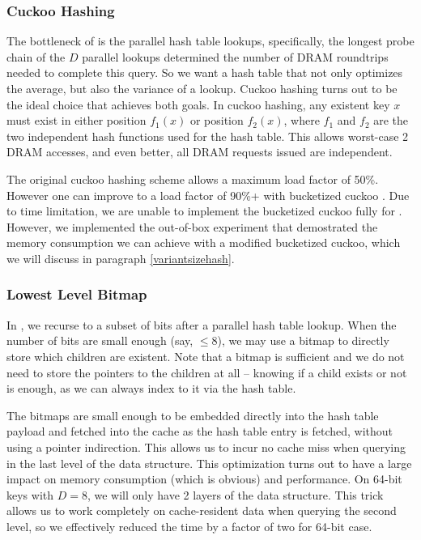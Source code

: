 \documentclass[11pt, usletter]{article}
\begin{document}
\subsubsection*{Cuckoo Hashing}

The bottleneck of \MlpIndex is the parallel hash table lookups, 
specifically, the longest probe chain of the $D$ parallel lookups determined the number 
of DRAM roundtrips needed to complete this query. 
So we want a hash table that not only optimizes the average, but also the variance of a lookup. 
Cuckoo hashing \cite{cuckoohash} turns out to be the ideal choice that achieves both goals. 
In cuckoo hashing, any existent key $x$ must exist in either position $f_1(x)$ 
or position $f_2(x)$, where $f_1$ and $f_2$ are the two independent hash functions used for the hash table.
This allows worst-case 2 DRAM accesses, and even better, all DRAM requests issued are independent. 

The original cuckoo hashing scheme allows a maximum load factor of 50\%. 
However one can improve to a load factor of 90\%+ with bucketized cuckoo \cite{bucketcuckoo}. 
Due to time limitation, we are unable to implement the bucketized cuckoo fully for \MlpIndex. 
However, we implemented the out-of-box experiment that 
demostrated the memory consumption we can achieve with a modified bucketized cuckoo, 
which we will discuss in paragraph \ref{variantsizehash}.

\subsubsection*{Lowest Level Bitmap} \label{lowestlevelbitmap}

In \MlpIndex, we recurse to a subset of bits after a parallel hash table lookup. 
When the number of bits are small enough (say, $\leq 8$), we may use a bitmap 
to directly store which children are existent. 
Note that a bitmap is sufficient and we do not need to store the pointers to the children at all -- 
knowing if a child exists or not is enough, as we can always index to it via the hash table.

The bitmaps are small enough to be embedded directly into the hash table payload 
and fetched into the cache as the hash table entry is fetched, without using a pointer indirection. 
This allows us to incur no cache miss when querying in the last level of the data structure. 
This optimization turns out to have a large impact on memory consumption (which is obvious) and performance. 
On 64-bit keys with $D=8$, we will only have 2 layers of the data structure. 
This trick allows us to work completely on cache-resident data when querying the second level, 
so we effectively reduced the time by a factor of two for 64-bit case.
\end{document}
